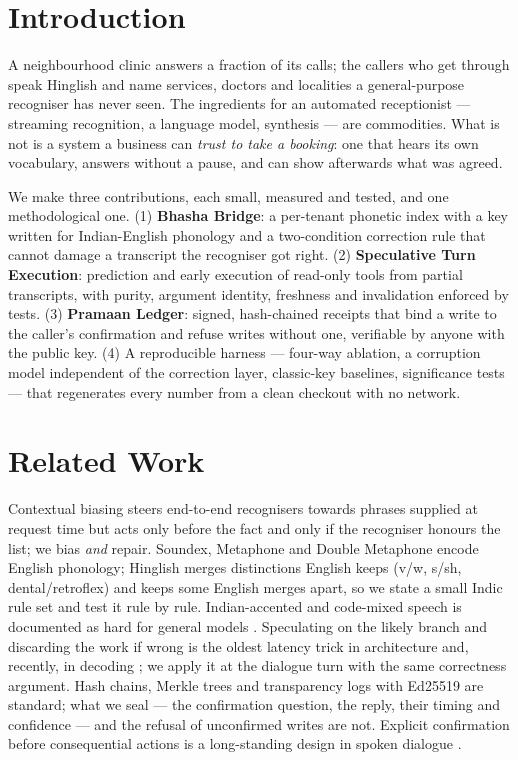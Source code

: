\documentclass[conference]{IEEEtran}
\begin{document}
\section{Introduction}

A neighbourhood clinic answers a fraction of its calls; the callers who get through speak Hinglish and name services, doctors and localities a general-purpose recogniser has never seen. The ingredients for an automated receptionist --- streaming recognition, a language model, synthesis --- are commodities. What is not is a system a business can \emph{trust to take a booking}: one that hears its own vocabulary, answers without a pause, and can show afterwards what was agreed.

We make three contributions, each small, measured and tested, and one methodological one. (1) \textbf{Bhasha Bridge}: a per-tenant phonetic index with a key written for Indian-English phonology and a two-condition correction rule that cannot damage a transcript the recogniser got right. (2) \textbf{Speculative Turn Execution}: prediction and early execution of read-only tools from partial transcripts, with purity, argument identity, freshness and invalidation enforced by tests. (3) \textbf{Pramaan Ledger}: signed, hash-chained receipts that bind a write to the caller's confirmation and refuse writes without one, verifiable by anyone with the public key. (4) A reproducible harness --- four-way ablation, a corruption model independent of the correction layer, classic-key baselines, significance tests --- that regenerates every number from a clean checkout with no network.

\section{Related Work}

Contextual biasing steers end-to-end recognisers towards phrases supplied at request time \cite{pundak2018,zhao2019} but acts only before the fact and only if the recogniser honours the list; we bias \emph{and} repair. Soundex, Metaphone and Double Metaphone \cite{russell1918,philips1990} encode English phonology; Hinglish merges distinctions English keeps (v/w, s/sh, dental/retroflex) and keeps some English merges apart, so we state a small Indic rule set and test it rule by rule. Indian-accented and code-mixed speech is documented as hard for general models \cite{bali2014,javed2023,javed2024,radford2023}. Speculating on the likely branch and discarding the work if wrong is the oldest latency trick in architecture \cite{hennessy2017} and, recently, in decoding \cite{leviathan2023,chen2023}; we apply it at the dialogue turn with the same correctness argument. Hash chains, Merkle trees and transparency logs \cite{haber1991,merkle1987,laurie2013} with Ed25519 \cite{bernstein2012} are standard; what we seal --- the confirmation question, the reply, their timing and confidence --- and the refusal of unconfirmed writes are not. Explicit confirmation before consequential actions is a long-standing design in spoken dialogue \cite{bohus2005,skantze2005}.
\end{document}
